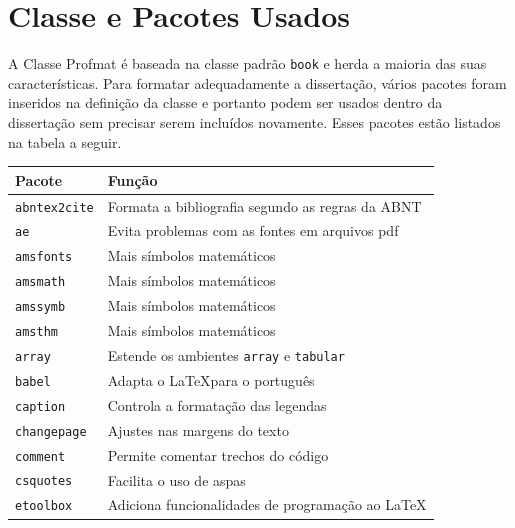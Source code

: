 \documentclass[fleqn]{profmat-cefet}
\begin{document}
\section{Classe e Pacotes Usados}
\label{sec:classe_e_pacotes_usados}

A Classe Profmat é baseada na classe padrão \lstinline!book! e herda a maioria 
das suas características. Para formatar adequadamente a dissertação, vários 
pacotes foram inseridos na definição da classe e portanto podem ser usados
dentro da dissertação sem precisar serem incluídos novamente. 
Esses pacotes estão listados na tabela a seguir.

\begin{center}
    \begin{longtable}{ll}
        \hline
        Pacote                  & Função                                                       \\ \hline
        \lstinline!abntex2cite! & Formata a bibliografia segundo as regras da ABNT             \\
        \lstinline!ae!          & Evita problemas com as fontes em arquivos \textsf{pdf}       \\
        \lstinline!amsfonts!    & Mais símbolos matemáticos                                    \\
        \lstinline!amsmath!     & Mais símbolos matemáticos                                    \\
        \lstinline!amssymb!     & Mais símbolos matemáticos                                    \\
        \lstinline!amsthm!      & Mais símbolos matemáticos                                    \\
        \lstinline!array!       & Estende os ambientes \lstinline!array! e \lstinline!tabular! \\
        \lstinline!babel!       & Adapta o \LaTeX para o português                             \\
        \lstinline!caption!     & Controla a formatação das legendas                           \\
        \lstinline!changepage!  & Ajustes nas margens do texto                                 \\
        \lstinline!comment!     & Permite comentar trechos do código                           \\
        \lstinline!csquotes!    & Facilita o uso de aspas                                      \\
        \lstinline!etoolbox!    & Adiciona funcionalidades de programação ao \LaTeX            \\

\end{longtable}
\end{center}
\end{document}
